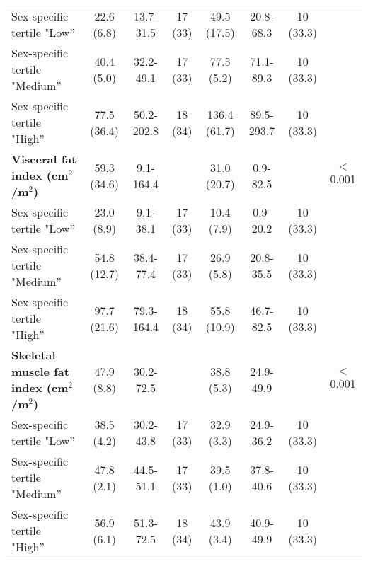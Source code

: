 \begin{sidewaystable}[p]
\begin{tabular}{|l|c c c | c c c |c|}
 	Sex-specific tertile "Low”                        &  22.6 (6.8)  & 13.7-31.5   & 17 (33) & 49.5 (17.5)  & 20.8-68.3   & 10 (33.3) &  \\
 	Sex-specific tertile "Medium”                     &  40.4 (5.0)  & 32.2-49.1   & 17 (33) & 77.5 (5.2)   & 71.1-89.3   & 10 (33.3) &  \\
 	Sex-specific tertile "High”                       & 77.5 (36.4)  & 50.2-202.8  & 18 (34) & 136.4 (61.7) & 89.5-293.7  & 10 (33.3) &  \\ \hline
 	\textbf{Visceral fat index (cm$^2$/m$^2$)}        & 59.3 (34.6)  & 9.1-164.4   &         & 31.0 (20.7)  & 0.9-82.5    &           & $<$0.001 \\
 	Sex-specific tertile "Low”                        &  23.0 (8.9)  & 9.1-38.1    & 17 (33) & 10.4 (7.9)   & 0.9-20.2    & 10 (33.3) &  \\
 	Sex-specific tertile "Medium”                     & 54.8 (12.7)  & 38.4-77.4   & 17 (33) & 26.9 (5.8)   & 20.8-35.5   & 10 (33.3) &  \\
 	Sex-specific tertile "High”                       & 97.7 (21.6)  & 79.3-164.4  & 18 (34) & 55.8 (10.9)  & 46.7-82.5   & 10 (33.3) &  \\ \hline
 	\textbf{Skeletal muscle fat index (cm$^2$/m$^2$)} &  47.9 (8.8)  & 30.2-72.5   &         & 38.8 (5.3)   & 24.9-49.9   &           & $<$0.001 \\
 	Sex-specific tertile "Low”                        &  38.5 (4.2)  & 30.2-43.8   & 17 (33) & 32.9 (3.3)   & 24.9-36.2   & 10 (33.3) &  \\
 	Sex-specific tertile "Medium”                     &  47.8 (2.1)  & 44.5-51.1   & 17 (33) & 39.5 (1.0)   & 37.8-40.6   & 10 (33.3) &  \\
 	Sex-specific tertile "High”                       &  56.9 (6.1)  & 51.3-72.5   & 18 (34) & 43.9 (3.4)   & 40.9-49.9   & 10 (33.3) &  \\ \hline
 \end{tabular}
\end{sidewaystable}